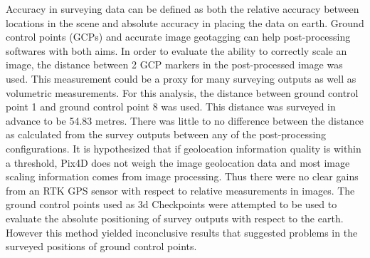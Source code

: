 \documentclass{article}
\begin{document}
Accuracy in surveying data can be defined as both the relative accuracy between locations in the scene
and absolute accuracy in placing the data on earth. Ground control points (GCPs) and accurate image geotagging can help post-processing softwares with both aims.
In order to evaluate the ability to correctly scale an image, the distance between 2 GCP markers in
the post-processed image was used.  This measurement could be a proxy for many surveying outputs
as well as volumetric measurements.  For this analysis, the distance between ground control point
1 and ground control point 8 was used.  This distance was surveyed in advance to be 54.83
metres. There was little to no difference between the distance as calculated from the survey outputs
between any of the post-processing configurations. It is hypothesized that if geolocation information quality is within a threshold, Pix4D does not weigh the image geolocation data and most image scaling information comes from image processing.  Thus there were no clear gains from an RTK GPS sensor with respect to relative measurements in images.
The ground control points used as 3d Checkpoints were attempted to be used to evaluate the absolute positioning of survey outputs with respect to the earth.  However this method yielded inconclusive results that suggested problems in the surveyed positions of ground control points.
\end{document}
